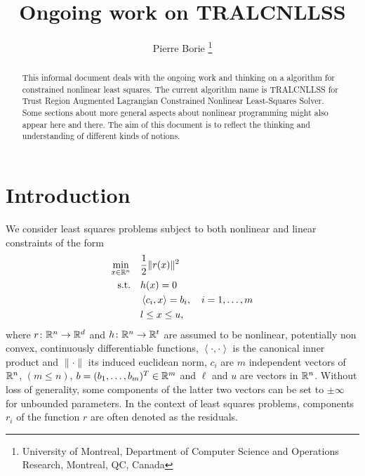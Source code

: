 \documentclass[10pt]{article}
\numberwithin{equation}{section}
\newcommand{\scal}[2]{\left\langle {#1} , {#2} \right\rangle} %
\newcommand{\footremember}[2]{%
	\footnote{#2}
	\newcounter{#1}
	\setcounter{#1}{\value{footnote}}%
}
\begin{document}
	
	
	\title{Ongoing work on TRALCNLLSS} %
	\author{Pierre Borie\footremember{1}{University of Montreal, Department of Computer Science and Operations Research, Montreal, QC, Canada}}
	\date{}
	
	
	
	\maketitle
	\tableofcontents
	
	\begin{abstract}
		\noindent This informal document deals with the ongoing work and thinking on a algorithm for constrained nonlinear least squares. The current algorithm  name is TRALCNLLSS for Trust Region Augmented Lagrangian Constrained Nonlinear Least-Squares Solver. Some sections about more general aspects about nonlinear programming might also appear here and there. The aim of this document is to reflect the thinking and understanding of different kinds of notions. 
	\end{abstract} %
	

	\section{Introduction}\label{sec:intro}
	
	We consider least squares problems subject to both nonlinear and linear constraints of the form
	\begin{equation}
		\label{eq:model_cnls}
		\begin{aligned}
			\min_{x\in \RR^n} \quad & \dfrac{1}{2} \|r(x)\|^2 \\
			\text{s.t.} \quad & h(x) = 0 \\
			& \scal{c_i}{x} = b_i,\quad i=1,\ldots,m \\
			& l \le x \le u,
		\end{aligned}
	\end{equation}
	where $r\colon {\mathbb{R}}^n \to {\mathbb{R}}^d$  and $h\colon {\mathbb{R}}^n \to {\mathbb{R}}^t$ are assumed to be nonlinear, potentially non convex, continuously differentiable functions, $\scal{\cdot}{\cdot}$ is the canonical inner product and $\|\cdot\| $  its induced euclidean norm, $c_i$ are $m$  independent vectors of ${\mathbb{R}}^n$, $( m \le n)$, $b=(b_1,\ldots,b_m)^T \in {\mathbb{R}}^m$ and $\ell$ and $u$ are vectors in ${\mathbb{R}}^n$. Without loss of generality, some components of the latter two vectors can be set to $\pm \infty$ for unbounded parameters. In the context of least squares problems, components $r_i$ of the function $r$ are often denoted as the residuals.
	
\end{document}
